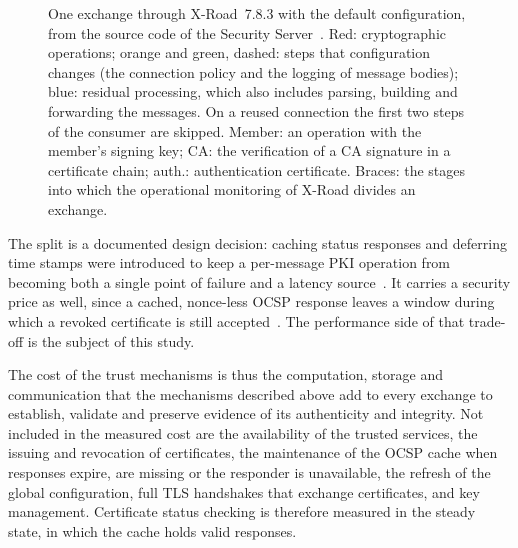 \documentclass[conference,a4paper]{IEEEtran}
\newcommand{\newtext}[1]{{\color{blue}#1}}
\begin{document}
\begin{figure}[!tb]
\caption{\newtext{One exchange through X-Road~7.8.3 with the default configuration, from the source
code of the Security Server~\cite{xroadsrc}. Red: cryptographic operations; orange and green,
dashed: steps that configuration changes (the connection policy and the logging of message bodies);
blue: \newtext{residual processing}, which also includes parsing, building and forwarding the messages. On a reused connection the first
two steps of the consumer are skipped. Member: an operation with the member's signing key; CA: the
verification of a CA signature in a certificate chain; auth.: authentication certificate. Braces:
the stages into which the operational monitoring of X-Road divides an exchange.}}
\label{fig:path}
\end{figure}

The split is a documented design decision: caching status responses and deferring time stamps were
introduced to keep a per-message PKI operation from becoming both a single point of failure and a
latency source~\cite{ansper2013}. It carries a security price as well, since a cached, nonce-less
OCSP response leaves a window during which a revoked certificate is still
accepted~\cite{bakhtina2023ares}. The performance side of that trade-off is the subject of this study.

\newtext{The cost of the trust mechanisms is thus the computation, storage and communication that
the mechanisms described above add to every exchange to establish, validate and preserve evidence
of its authenticity and integrity.} \newtext{Not included in the measured cost are the availability of the trusted services, the issuing
and revocation of certificates, the maintenance of the OCSP cache when responses expire, are missing
or the responder is unavailable, the refresh of the global configuration, full TLS handshakes that
exchange certificates, and key management. Certificate status checking is therefore measured in the
steady state, in which the cache holds valid responses.}
\end{document}
